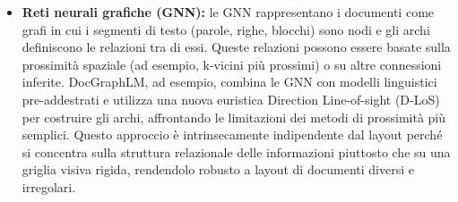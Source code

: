 \documentclass[a4paper, 11pt]{article}
\begin{document}
\begin{itemize}
    \item \textbf{Reti neurali grafiche (GNN):} le GNN rappresentano i documenti come grafi in cui i segmenti di testo (parole, righe, blocchi) sono nodi e gli archi definiscono le relazioni tra di essi. \cite{survey_deep_learning_ocr} Queste relazioni possono essere basate sulla prossimità spaziale (ad esempio, k-vicini più prossimi) o su altre connessioni inferite. DocGraphLM, ad esempio, combina le GNN con modelli linguistici pre-addestrati e utilizza una nuova euristica Direction Line-of-sight (D-LoS) per costruire gli archi, affrontando le limitazioni dei metodi di prossimità più semplici. \cite{docgraphlm_v1} Questo approccio è intrinsecamente indipendente dal layout perché si concentra sulla struttura relazionale delle informazioni piuttosto che su una griglia visiva rigida, rendendolo robusto a layout di documenti diversi e irregolari.
\end{itemize}
\end{document}
